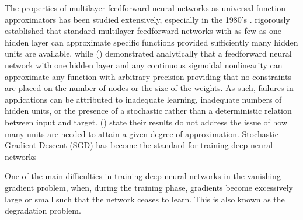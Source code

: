 The properties of multilayer feedforward neural networks as universal function approximators has been studied extensively, especially in the 1980's . \cite{hornik1989multilayer} rigorously established that standard multilayer feedforward networks with as few as one hidden layer can approximate specific functions provided sufficiently many hidden units are available. while (\cite{cybenko1989approximation}) demonstrated analytically that a feedforward neural network with one hidden layer and any continuous sigmoidal nonlinearity can approximate any function with arbitrary precision providing that
no constraints are placed on the number of nodes or the size of the weights. As such, failures in applications can be attributed to inadequate learning, inadequate numbers of hidden units, or the presence of a  stochastic rather than a deterministic relation between input and target. (\cite{hornik1989multilayer}) state their results do not address the issue of how many units are needed to attain a  given degree of approximation.  
Stochastic Gradient Descent (SGD) has become the standard for training deep neural networks

One of the main difficulties in training deep neural networks in the vanishing gradient problem, when, during the training phase, gradients become excessively large or small such that the network ceases to learn. This is also known as the degradation problem. 










